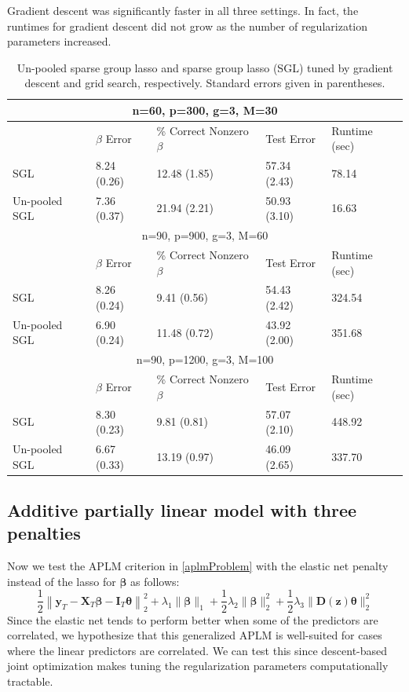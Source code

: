 \documentclass{statsoc}
\begin{document}
Gradient descent was significantly faster in all three settings. In fact, the runtimes for gradient descent did not grow as the number of regularization parameters increased.

\begin{table}
\caption{\label{table:unpooled} Un-pooled sparse group lasso and sparse group lasso (SGL) tuned by gradient descent and grid search, respectively. Standard errors given in parentheses.}
\centering
\begin{tabular}{| l | l | l | l | l | }
\hline
\multicolumn{5}{|c|}{n=60, p=300, g=3, M=30}\\
\hline
 & $\beta$ Error & \% Correct Nonzero $\beta$ & Test Error & Runtime (sec) \\
\hline
SGL & 8.24 (0.26) & 12.48 (1.85) & 57.34 (2.43) & 78.14 \\
\hline
Un-pooled SGL & 7.36 (0.37) & 21.94 (2.21) & 50.93 (3.10) & 16.63 \\
\hline
\multicolumn{5}{|c|}{n=90, p=900, g=3, M=60}\\
\hline
 & $\beta$ Error & \% Correct Nonzero $\beta$ & Test Error & Runtime (sec) \\
\hline
SGL & 8.26 (0.24) & 9.41 (0.56) & 54.43 (2.42) & 324.54 \\
\hline
Un-pooled SGL & 6.90 (0.24) & 11.48 (0.72) & 43.92 (2.00) & 351.68 \\
\hline
\multicolumn{5}{|c|}{n=90, p=1200, g=3, M=100}\\
\hline
 & $\beta$ Error & \% Correct Nonzero $\beta$ & Test Error & Runtime (sec) \\
\hline
SGL & 8.30 (0.23) & 9.81 (0.81) & 57.07 (2.10) & 448.92 \\
\hline
Un-pooled SGL & 6.67 (0.33) & 13.19 (0.97) & 46.09 (2.65) & 337.70 \\
\hline
\end{tabular}
\end{table}

\subsection{Additive partially linear model with three penalties}
Now we test the APLM criterion in \eqref{aplmProblem} with the elastic net penalty instead of the lasso for $\boldsymbol \beta$ as follows:
\begin{equation}
\frac{1}{2} \left \|
\boldsymbol{y}_T
- \boldsymbol{X}_T\boldsymbol{\beta}
- \boldsymbol{I}_T \boldsymbol{\theta} \right \|^2_2
+ \lambda_1 \| \boldsymbol \beta \|_1
+ \frac{1}{2} \lambda_2 \| \boldsymbol \beta \|_2^2
+ \frac{1}{2} \lambda_3 \| \boldsymbol D(\boldsymbol z) \boldsymbol \theta \|_2^2
\end{equation}
Since the elastic net tends to perform better when some of the predictors are correlated, we hypothesize that this generalized APLM is well-suited for cases where the linear predictors are correlated. We can test this since descent-based joint optimization makes tuning the regularization parameters computationally tractable.
\end{document}
